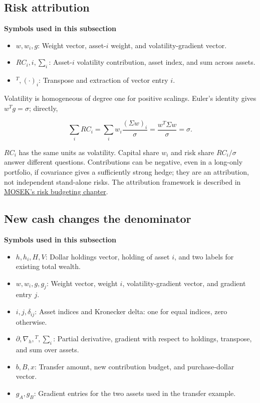 \documentclass[
  american,
  11pt,
]{article}
\begin{document}
\subsection{Risk attribution}\label{risk-attribution}

\textbf{Symbols used in this subsection}
\begin{itemize}
\item \(w,w_i,g\): Weight vector, asset-$i$ weight, and volatility-gradient vector.
\item \(RC_i,i,\sum_i\): Asset-$i$ volatility contribution, asset index, and sum across assets.
\item \({}^T,(\cdot)_i\): Transpose and extraction of vector entry $i$.
\end{itemize}


Volatility is homogeneous of degree one for positive scalings. Euler's
identity gives \(w^Tg=\sigma\); directly,

\[\sum_i RC_i=\sum_i w_i\frac{(\Sigma w)_i}{\sigma}
=\frac{w^T\Sigma w}{\sigma}=\sigma.\]

\(RC_i\) has the same units as volatility. Capital share \(w_i\) and
risk share \(RC_i/\sigma\) answer different questions. Contributions can
be negative, even in a long-only portfolio, if covariance gives a
sufficiently strong hedge; they are an attribution, not independent
stand-alone risks. The attribution framework is described in
\href{https://docs.mosek.com/portfolio-cookbook/risk_parity.html}{MOSEK's
risk budgeting chapter}.

\subsection{New cash changes the
denominator}\label{new-cash-changes-the-denominator}

\textbf{Symbols used in this subsection}
\begin{itemize}
\item \(h,h_i,H,V\): Dollar holdings vector, holding of asset $i$, and two labels for existing total wealth.
\item \(w,w_i,g,g_j\): Weight vector, weight $i$, volatility-gradient vector, and gradient entry $j$.
\item \(i,j,\delta_{ij}\): Asset indices and Kronecker delta: one for equal indices, zero otherwise.
\item \(\partial,\nabla_h,{}^T,\sum_i\): Partial derivative, gradient with respect to holdings, transpose, and sum over assets.
\item \(b,B,x\): Transfer amount, new contribution budget, and purchase-dollar vector.
\item \(g_A,g_B\): Gradient entries for the two assets used in the transfer example.
\end{itemize}
\end{document}
